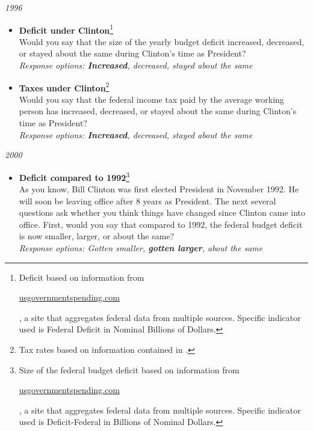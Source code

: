 \documentclass[12pt, letterpaper]{article}
\begin{document}
\vspace{2mm}

\large \noindent\textit{1996}

\vspace{2mm}

\normalsize
\begin{itemize}
\item \textbf{Deficit under Clinton}\footnote{Deficit based on information from \begin{footnotesize}\url{usgovernmentspending.com}\end{footnotesize}, a site that aggregates federal data from multiple sources. Specific indicator used is Federal Deficit in Nominal Billions of Dollars.} \\
Would you say that the size of the yearly budget deficit increased, decreased, or stayed about the same during Clinton's time as President?         \\     
\textit{Response options: \textbf{Increased}, decreased, stayed about the same} 
\end{itemize}

\normalsize
\begin{itemize}
\item \textbf{Taxes under Clinton}\footnote{Tax rates based on information contained in \citet{allen_1996}.} \\
Would you say that the federal income tax paid by the average working person has increased, decreased, or stayed about the same during Clinton's time as President?      \\
\textit{Response options: \textbf{Increased}, decreased, stayed about the same} 
\end{itemize}

\vspace{2mm}

\large \noindent\textit{2000}

\vspace{2mm}

\normalsize
\begin{itemize}
\item \textbf{Deficit compared to 1992}\footnote{Size of the federal budget deficit based on information from \begin{footnotesize}\url{usgovernmentspending.com}\end{footnotesize}, a site that aggregates federal data from multiple sources. Specific indicator used is Deficit-Federal in Billions of Nominal Dollars.} \\
As you know, Bill Clinton was first elected President in November 1992. He will soon be leaving office after 8 years as President. The next several questions ask whether you think things have changed since Clinton came into office. First, would you say that compared to 1992, the federal budget deficit is now smaller, larger, or about the same?        \\     
\textit{Response options: Gotten smaller, \textbf{gotten larger}, about the same} \\
\end{itemize}
\end{document}
